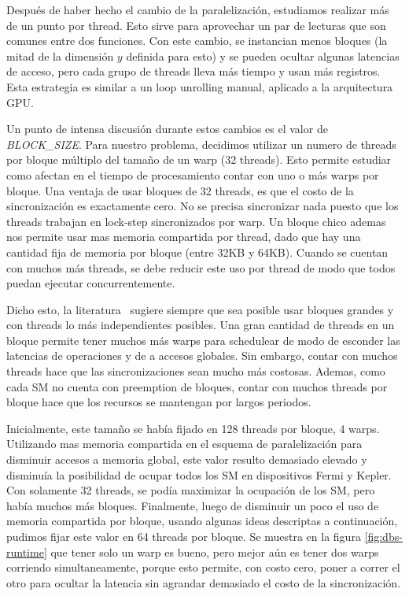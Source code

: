 
Despu\'es de haber hecho el cambio de la paralelizaci\'on, estudiamos realizar
m\'as de un punto por thread. Esto sirve para aprovechar un par de lecturas que son comunes
entre dos funciones. Con este cambio, se instancian menos bloques (la mitad de la dimensi\'on $y$
definida para esto) y se pueden ocultar algunas latencias de acceso, pero
cada grupo de threads lleva m\'as tiempo y usan m\'as registros. Esta estrategia es similar
a un loop unrolling manual, aplicado a la arquitectura GPU.

Un punto de intensa discusi\'on durante estos cambios es el valor de \textit{BLOCK\_SIZE}.
Para nuestro problema, decidimos utilizar un numero de threads por bloque m\'ultiplo del
tama\~no de un warp (32 threads). Esto permite estudiar como afectan en el tiempo de
procesamiento contar con uno o m\'as warps por bloque. Una ventaja de usar bloques de
32 threads, es que el costo de la sincronizaci\'on es exactamente cero. No se precisa
sincronizar nada puesto que los threads trabajan en lock-step sincronizados por warp.
Un bloque chico ademas nos permite usar mas memoria compartida por thread, dado que hay una
cantidad fija de memoria por bloque (entre 32KB y 64KB). Cuando se cuentan con muchos m\'as
threads, se debe reducir este uso por thread de modo que todos puedan ejecutar concurrentemente.

Dicho esto, la literatura~\cite{farberCuda} sugiere siempre que sea posible
usar bloques grandes y con threads lo m\'as independientes posibles. Una gran cantidad de threads
en un bloque permite tener muchos m\'as warps para schedulear de modo de esconder las latencias de
operaciones y de a accesos globales. Sin embargo, contar con muchos threads hace que las
sincronizaciones sean mucho m\'as costosas. Ademas, como cada SM no cuenta con preemption
de bloques, contar con muchos threads por bloque hace que los recursos se mantengan
por largos periodos.

Inicialmente, este tama\~no se hab\'ia fijado en 128 threads por bloque, 4 warps. Utilizando
mas memoria compartida en el esquema de paralelizaci\'on para disminuir accesos a memoria global,
este valor resulto demasiado elevado y disminu\'ia la posibilidad de ocupar todos los SM en dispositivos
Fermi y Kepler. Con solamente 32 threads, se pod\'ia maximizar la ocupaci\'on de los SM, pero hab\'ia
muchos m\'as bloques. Finalmente, luego de disminuir un poco el uso de memoria compartida por
bloque, usando algunas ideas descriptas a continuaci\'on, pudimos fijar este valor en 64 threads
por bloque. Se muestra en la figura \ref{fig:dbs-runtime} que tener solo un warp es bueno, pero
mejor a\'un es tener dos warps corriendo simultaneamente, porque
esto permite, con costo cero, poner a correr el otro para ocultar la latencia sin agrandar
demasiado el costo de la sincronizaci\'on.

